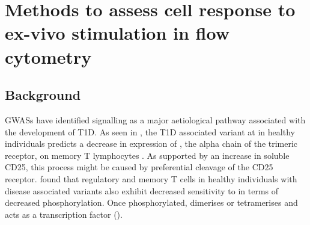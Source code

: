 \chapter{ \label{chapter:il2} Methods to assess cell response to ex-vivo stimulation in flow cytometry }


\section{Background}

\Glspl{GWAS} have identified  signalling as a major aetiological pathway associated with the development of T1D.  
As seen in , the \gls{T1D} associated  variant at  in healthy individuals predicts a decrease in expression of ,
the alpha chain of the trimeric  receptor, on memory \positive T lymphocytes \citep{Dendrou:2008gc,Dendrou:2009dv}.
As supported by an increase in soluble CD25, this process might be caused by preferential cleavage of the CD25 receptor.  
\citet{Garg:2012jr} found that regulatory and memory \positive T cells in healthy individuals with disease associated  variants also exhibit decreased sensitivity to  in terms of decreased  phosphorylation.
Once phosphorylated,  dimerises or tetramerises and acts as a transcription factor ().

